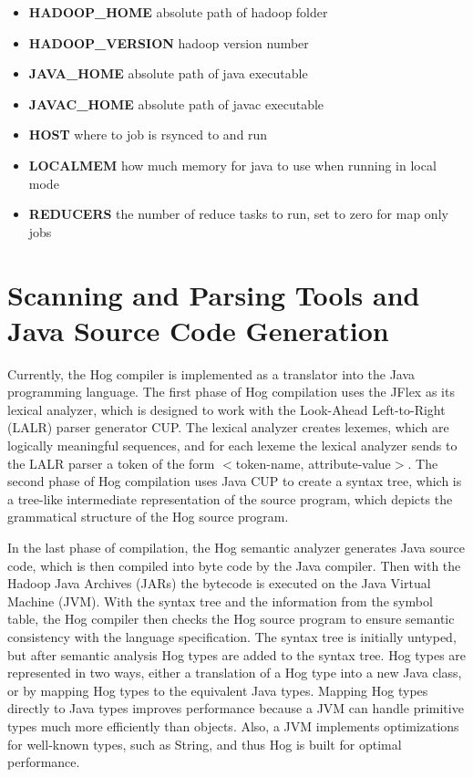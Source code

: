 \documentclass{article}
\begin{document}
\begin{itemize}

\item[] \textbf{HADOOP\_HOME} absolute path of hadoop folder
\item[] \textbf{HADOOP\_VERSION} hadoop version number
\item[] \textbf{JAVA\_HOME} absolute path of java executable
\item[] \textbf{JAVAC\_HOME} absolute path of javac executable
\item[] \textbf{HOST} where to job is rsynced to and run
\item[] \textbf{LOCALMEM} how much memory for java to use when running in local mode 
\item[] \textbf{REDUCERS} the number of reduce tasks to run, set to zero for map only jobs

\end{itemize}


\section{Scanning and Parsing Tools and Java Source Code Generation} %
\label{sec:parsing_tools}

Currently, the Hog compiler is implemented as a translator into the Java
programming language. The first phase of Hog compilation uses the JFlex as its
lexical analyzer, which is designed to work with the Look-Ahead Left-to-Right
(LALR) parser generator CUP. The lexical analyzer creates lexemes, which are
logically meaningful sequences, and for each lexeme the lexical analyzer sends to
the LALR parser a token of the form $<$token-name, attribute-value$>$. The second
phase of Hog compilation uses Java CUP to create a syntax tree, which is a
tree-like intermediate representation of the source program, which depicts the
grammatical structure of the Hog source program.

In the last phase of compilation, the Hog semantic analyzer generates Java source
code, which is then compiled into byte code by the Java compiler. Then with the
Hadoop Java Archives (JARs) the bytecode is executed on the Java Virtual Machine
(JVM). With the syntax tree and the information from the symbol table, the Hog
compiler then checks the Hog source program to ensure semantic consistency with
the language specification. The syntax tree is initially untyped, but after
semantic analysis Hog types are added to the syntax tree. Hog types are
represented in two ways, either a translation of a Hog type into a new Java class,
or by mapping Hog types to the equivalent Java types. Mapping Hog types directly
to Java types improves performance because a JVM can handle primitive types much
more efficiently than objects. Also, a JVM implements optimizations for well-known
types, such as String, and thus Hog is built for optimal performance.
\end{document}
